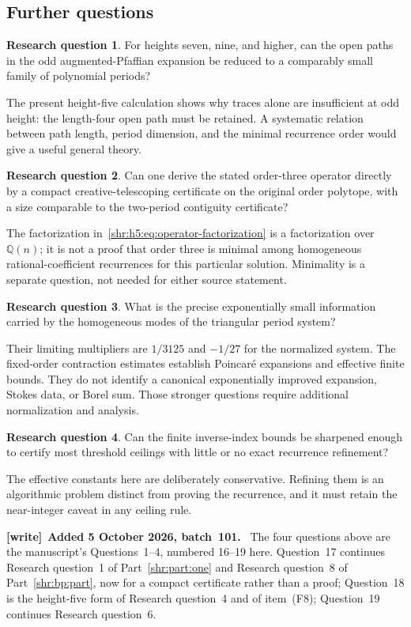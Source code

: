 \documentclass[11pt,letterpaper]{article}
\numberwithin{equation}{section}
\theoremstyle{definition}
\newtheorem{question}{Research question}
\newcommand{\Q}{\mathbb Q}
\newcommand{\1}{\mathbf 1}
\newenvironment{writenote}[1][]{\par\smallskip\begingroup\small
 \noindent\textbf{[write]}\if\relax\detokenize{#1}\relax\else~\textbf{#1.}\fi\ }%
 {\par\endgroup\smallskip}
\begin{document}
\subsection{Further questions}
\begin{question}
For heights seven, nine, and higher, can the open paths in the odd
augmented-Pfaffian expansion be reduced to a comparably small family of
polynomial periods?
\end{question}
The present height-five calculation shows why traces alone are
insufficient at odd height: the length-four open path must be retained.
A systematic relation between path length, period dimension, and the
minimal recurrence order would give a useful general theory.

\begin{question}
Can one derive the stated order-three operator directly by a compact
creative-telescoping certificate on the original order polytope, with a
size comparable to the two-period contiguity certificate?
\end{question}
The factorization in~\eqref{shr:h5:eq:operator-factorization} is a factorization
over $\Q(n)$; it is not a proof that order three is minimal among
homogeneous rational-coefficient recurrences for this particular solution.
Minimality is a separate question, not needed for either source statement.

\begin{question}
What is the precise exponentially small information carried by the
homogeneous modes of the triangular period system?
\end{question}
Their limiting multipliers are $1/3125$ and $-1/27$ for the normalized
system. The fixed-order contraction estimates establish Poincar\'e
expansions and effective finite bounds. They do not identify a canonical
exponentially improved expansion, Stokes data, or Borel sum. Those stronger
questions require additional normalization and analysis.

\begin{question}
Can the finite inverse-index bounds be sharpened enough to certify most
threshold ceilings with little or no exact recurrence refinement?
\end{question}
The effective constants here are deliberately conservative. Refining them
is an algorithmic problem distinct from proving the recurrence, and it
must retain the near-integer caveat in any ceiling rule.

\begin{writenote}[Added 5 October 2026, batch~101]
The four questions above are the manuscript's Questions~1--4, numbered
16--19 here. Question~17 continues Research question~1 of
Part~\ref{shr:part:one} and Research question~8 of
Part~\ref{shr:bp:part}, now for a compact certificate rather than a proof;
Question~18 is the height-five form of Research question~4 and of item~(F8);
Question~19 continues Research question~6.
\end{writenote}
\end{document}
